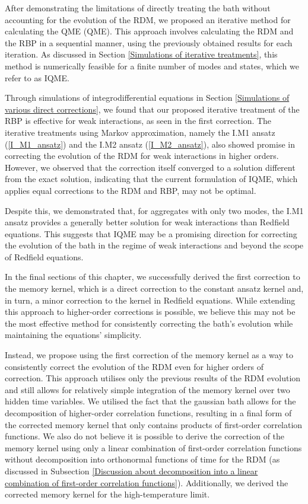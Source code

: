After demonstrating the limitations of directly treating the bath without accounting for the evolution of the RDM, we proposed an iterative method for calculating the QME (QME). This approach involves calculating the RDM and the RBP in a sequential manner, using the previously obtained results for each iteration. As discussed in Section \ref{Simulations of iterative treatments}, this method is numerically feasible for a finite number of modes and states, which we refer to as IQME.

Through simulations of integrodifferential equations in Section \ref{Simulations of various direct corrections}, we found that our proposed iterative treatment of the RBP is effective for weak interactions, as seen in the first correction. The iterative treatments using Markov approximation, namely the I.M1 ansatz (\ref{I_M1_ansatz}) and the I.M2 ansatz (\ref{I_M2_ansatz}), also showed promise in correcting the evolution of the RDM for weak interactions in higher orders. However, we observed that the correction itself converged to a solution different from the exact solution, indicating that the current formulation of IQME, which applies equal corrections to the RDM and RBP, may not be optimal.

Despite this, we demonstrated that, for aggregates with only two modes, the I.M1 ansatz provides a generally better solution for weak interactions than Redfield equations. This suggests that IQME may be a promising direction for correcting the evolution of the bath in the regime of weak interactions and beyond the scope of Redfield equations.

In the final sections of this chapter, we successfully derived the first correction to the memory kernel, which is a direct correction to the constant ansatz kernel and, in turn, a minor correction to the kernel in Redfield equations. While extending this approach to higher-order corrections is possible, we believe this may not be the most effective method for consistently correcting the bath's evolution while maintaining the equations' simplicity.

Instead, we propose using the first correction of the memory kernel as a way to consistently correct the evolution of the RDM even for higher orders of correction. This approach utilises only the previous results of the RDM evolution and still allows for relatively simple integration of the memory kernel over two hidden time variables. We utilised the fact that the gaussian bath allows for the decomposition of higher-order correlation functions, resulting in a final form of the corrected memory kernel that only contains products of first-order correlation functions. We also do not believe it is possible to derive the correction of the memory kernel using only a linear combination of first-order correlation functions without decomposition into orthonormal functions of time for the RDM (as discussed in Subsection \ref{Discussion about decomposition into a linear combination of first-order correlation functions}). Additionally, we derived the corrected memory kernel for the high-temperature limit.


